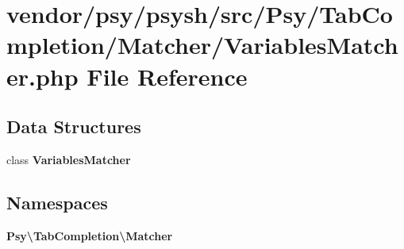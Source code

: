 \section{vendor/psy/psysh/src/\+Psy/\+Tab\+Completion/\+Matcher/\+Variables\+Matcher.php File Reference}
\label{_variables_matcher_8php}
\subsection*{Data Structures}
\begin{DoxyCompactItemize}
\item 
class {\bf Variables\+Matcher}
\end{DoxyCompactItemize}
\subsection*{Namespaces}
\begin{DoxyCompactItemize}
\item 
 {\bf Psy\textbackslash{}\+Tab\+Completion\textbackslash{}\+Matcher}
\end{DoxyCompactItemize}
